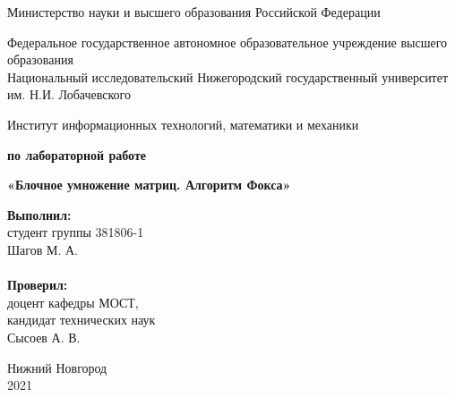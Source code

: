 \documentclass{report}
\begin{document}
\begin{titlepage}

\begin{center}
Министерство науки и высшего образования Российской Федерации
\end{center}

\begin{center}
Федеральное государственное автономное образовательное учреждение высшего образования \\
Национальный исследовательский Нижегородский государственный университет им. Н.И. Лобачевского
\end{center}

\begin{center}
Институт информационных технологий, математики и механики
\end{center}

\vspace{4em}

\begin{center}
\textbf{ по лабораторной работе} \\
\end{center}
\begin{center}
\textbf{\Large«Блочное умножение матриц. Алгоритм Фокса»} \\
\end{center}

\vspace{4em}

\newbox{\lbox}
\newlength{\maxl}
\setlength{\maxl}{\wd\lbox}
\hfill\parbox{7cm}{
\hspace*{5cm}\hspace*{-5cm}\textbf{Выполнил:} \\ студент группы 381806-1 \\ Шагов М. А.\\
\\
\hspace*{5cm}\hspace*{-5cm}\textbf{Проверил:}\\ доцент кафедры МОСТ, \\ кандидат технических наук \\ Сысоев А. В.\\}

\vspace{\fill}

\begin{center} Нижний Новгород \\ 2021 \end{center}

\end{titlepage}
\end{document}
